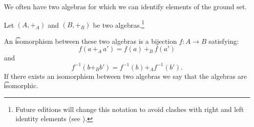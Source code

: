 

We often have two algebras for which we can identify elements of the ground set.


Let $(A, +_{A})$ and $(B, +_B)$ be two algebras.\footnote{Future editions will change this notation to avoid clashes with right and left identity elements (see ).}

An \t{isomorphism} between these two algebras is a bijection $f: A \to B$ satisfying:
\[
  f(a \, +_A \, a') =  f(a) \, +_B \, f(a')
\]
and
\[
  f^{-1}(b +_B b') = f^{-1}(b) +_A f^{-1}(b').
\]
If there exists an isomorphism between two algebras we say that the algebras are \t{isomorphic}.

\blankpage
